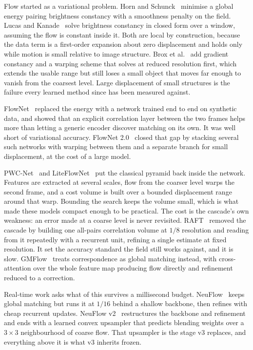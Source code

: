 \documentclass[11pt,a4paper]{article}
\begin{document}
Flow started as a variational problem. Horn and Schunck~\cite{hs81} minimise a
global energy pairing brightness constancy with a smoothness penalty on the
field. Lucas and Kanade~\cite{lk81} solve brightness constancy in closed form
over a window, assuming the flow is constant inside it. Both are local by
construction, because the data term is a first-order expansion about zero
displacement and holds only while motion is small relative to image structure.
Brox et al.~\cite{brox04} add gradient constancy and a warping scheme that solves
at reduced resolution first, which extends the usable range but still loses a
small object that moves far enough to vanish from the coarsest level. Large
displacement of small structures is the failure every learned method since has
been measured against.

FlowNet~\cite{flownet} replaced the energy with a network trained end to end on
synthetic data, and showed that an explicit correlation layer between the two
frames helps more than letting a generic encoder discover matching on its own. It
was well short of variational accuracy. FlowNet 2.0~\cite{flownet2} closed that
gap by stacking several such networks with warping between them and a separate
branch for small displacement, at the cost of a large model.

PWC-Net~\cite{pwcnet} and LiteFlowNet~\cite{liteflownet} put the classical
pyramid back inside the network. Features are extracted at several scales, flow
from the coarser level warps the second frame, and a cost volume is built over a
bounded displacement range around that warp. Bounding the search keeps the volume
small, which is what made these models compact enough to be practical. The cost
is the cascade's own weakness: an error made at a coarse level is never revisited.
RAFT~\cite{raft} removed the cascade by building one all-pairs correlation volume
at $1/8$ resolution and reading from it repeatedly with a recurrent unit,
refining a single estimate at fixed resolution. It set the accuracy standard the
field still works against, and it is slow. GMFlow~\cite{gmflow} treats
correspondence as global matching instead, with cross-attention over the whole
feature map producing flow directly and refinement reduced to a correction.

Real-time work asks what of this survives a millisecond budget.
NeuFlow~\cite{neuflow1} keeps global matching but runs it at $1/16$ behind a
shallow backbone, then refines with cheap recurrent updates.
NeuFlow v2~\cite{neuflow2} restructures the backbone and refinement and ends with
a learned convex upsampler that predicts blending weights over a $3\times3$
neighbourhood of coarse flow. That upsampler is the stage v3 replaces, and
everything above it is what v3 inherits frozen.
\end{document}
